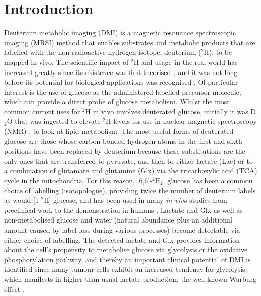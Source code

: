 \documentclass[class=article, crop=false]{standalone}
\begin{document}
 
\label{Chap:Glucose}

\section{Introduction}

Deuterium metabolic imaging (DMI) is a magnetic resonance spectroscopic imaging (MRSI) method that enables substrates and metabolic products that are labelled with the non-radioactive hydrogen isotope, deuterium ($^2$H), to be mapped in vivo. The scientific impact of $^2$H and usage in the real world has increased greatly since its existence was first theorised \cite{Urey1932AConcentration}, and it was not long before its potential for biological applications was recognised \cite{Schoenheimer1935DeuteriumMetabolism, Schoenheimer1938TheMetabolism}. Of particular interest is the use of glucose as the administered labelled precursor molecule, which can provide a direct probe of glucose metabolism. Whilst the most common current uses for $^2$H in vivo involves deuterated glucose, initially it was D$_2$O that was ingested to elevate $^2$H levels for use in nuclear magnetic spectroscopy (NMR) \cite{Brereton1986PreliminarySpectroscopy, Irving1987InSpectroscopy}, to look at lipid metabolism. The most useful forms of deuterated glucose are those whose carbon-bonded hydrogen atoms in the first and sixth positions have been replaced by deuterium because these substitutions are the only ones that are transferred to pyruvate, and then to either lactate (Lac) or to a combination of glutamate and glutamine (Glx) via the tricarboxylic acid (TCA) cycle in the mitochondria. For this reason, [6,6'-$^2$H$_2$] glucose has been a common choice of labelling (isotopologue), providing twice the number of deuterium labels as would [1-$^2$H] glucose, and has been used in many \textit{in vivo} studies from preclinical work \cite{Lu2017QuantitativeSpectroscopy, Meerwaldt2023InImaging} to the demonstration in humans \cite{DeFeyter2018DeuteriumVivo, Roig2022Deuterium7T}. Lactate and Glx as well as non-metabolised glucose and water (natural abundance plus an additional amount caused by label-loss during various processes) become detectable via either choice of labelling. The detected lactate and Glx provides information about the cell’s propensity to metabolise glucose via glycolysis or the oxidative phosphorylation pathway, and thereby an important clinical potential of DMI is identified since many tumour cells exhibit an increased tendency for glycolysis, which manifests in higher than usual lactate production;  the well-known Warburg effect \cite{Warburg1956OnCells}.    
\end{document}
